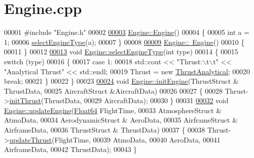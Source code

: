 \hypertarget{_engine_8cpp_source}{}\section{Engine.\+cpp}
\label{_engine_8cpp_source}

\begin{DoxyCode}
00001 \textcolor{preprocessor}{#include "Engine.h"}
00002 
\hyperlink{group___engine_a8c98683b0a3aa28d8ab72a8bcd0d52f2}{00003} \hyperlink{group___engine_a8c98683b0a3aa28d8ab72a8bcd0d52f2}{Engine::Engine}()
00004 \{
00005     \textcolor{keywordtype}{int} a = 1;
00006     \hyperlink{group___engine_ac33371d6fff86c0c8e14495f10046d9a}{selectEngineType}(a);
00007 \}
00008 
\hyperlink{group___engine_a8ef7030a089ecb30bbfcb9e43094717a}{00009} \hyperlink{group___engine_a8ef7030a089ecb30bbfcb9e43094717a}{Engine::~Engine}()
00010 \{
00011 \}
00012 
\hyperlink{group___engine_ac33371d6fff86c0c8e14495f10046d9a}{00013} \textcolor{keywordtype}{void} \hyperlink{group___engine_ac33371d6fff86c0c8e14495f10046d9a}{Engine::selectEngineType}(\textcolor{keywordtype}{int} type)
00014 \{
00015     \textcolor{keywordflow}{switch} (type)
00016     \{
00017     \textcolor{keywordflow}{case} 1:
00018         std::cout << \textcolor{stringliteral}{"Thrust:\(\backslash\)t\(\backslash\)t"} << \textcolor{stringliteral}{"Analytical Thrust"} << std::endl;
00019         Thrust = \textcolor{keyword}{new} \hyperlink{group___engine_class_thrust_analytical}{ThrustAnalytical};
00020         \textcolor{keywordflow}{break};
00021     \}
00022 \}
00023 
\hyperlink{group___engine_aee607dba02101af5b299920f89b56e79}{00024} \textcolor{keywordtype}{void} \hyperlink{group___engine_aee607dba02101af5b299920f89b56e79}{Engine::initEngine}(ThrustStruct & ThrustData,
00025                         AircraftStruct &AircraftData)
00026             
00027 \{
00028     Thrust->\hyperlink{group___engine_a02b3fe7f763d84c5d34b59f124eaf455}{initThrust}(ThrustData,
00029                        AircraftData);
00030 \}
00031 
\hyperlink{group___engine_a9e16100ffd33cf8ec632257795c03865}{00032} \textcolor{keywordtype}{void} \hyperlink{group___engine_a9e16100ffd33cf8ec632257795c03865}{Engine::updateEngine}(\hyperlink{group___tools_ga3f1431cb9f76da10f59246d1d743dc2c}{Float64} FlightTime,
00033                         AtmosphereStruct & AtmoData,
00034                         AerodynamicStruct & AeroData,
00035                         AirframeStruct & AirframeData,
00036                         ThrustStruct & ThrustData)
00037 \{
00038     Thrust->\hyperlink{group___engine_a869359a1b2b7cddcbe5979d6a1cf5eac}{updateThrust}(FlightTime,
00039                          AtmoData,
00040                          AeroData,
00041                          AirframeData,
00042                          ThrustData);
00043 \}
\end{DoxyCode}
